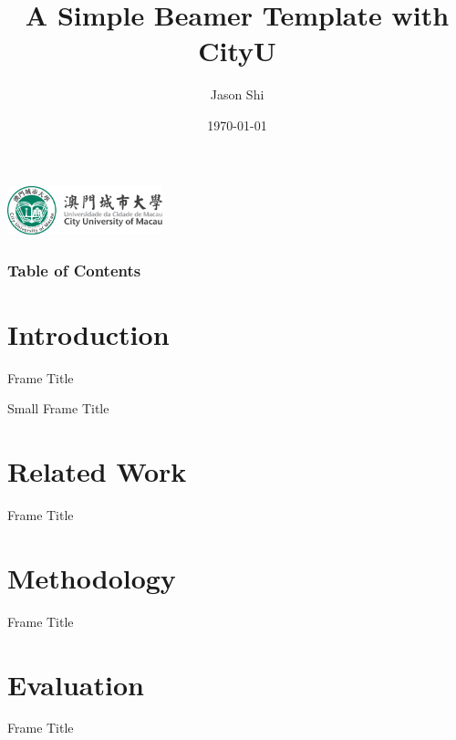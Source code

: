 \documentclass{beamer}
\title[]
{A Simple Beamer Template with CityU }
\author[Jason]{Jason Shi}
\institute[MHC-Lab]
{
  City University of Macau
}
\date[\today]{\today}
\begin{document}
\begin{frame}[plain]
    \centering
    \includegraphics[width=4.5cm]{fig/cityu.pdf}
    \vspace{-5mm}
    \titlepage
\end{frame}

\begin{frame}[plain]
\frametitle{Table of Contents}
\hfill
\parbox[t]{.95\textwidth}{
  \begin{minipage}[t][0.8\textheight]{0.95\textwidth}
\tableofcontents[sectionstyle=show,subsectionstyle=show/shaded/hide,subsubsectionstyle=show/shaded/hide]
  \end{minipage}
}
\end{frame}

\section{Introduction}

\begin{frame}{Frame Title}
\end{frame}


{   
\begin{frame}{Small Frame Title}
\end{frame}
}


\section{Related Work}

\begin{frame}{Frame Title}
    
\end{frame}

\section{Methodology}

\begin{frame}{Frame Title}

\end{frame}


\section{Evaluation}
\begin{frame}{Frame Title}   
\end{frame}
\end{document}
